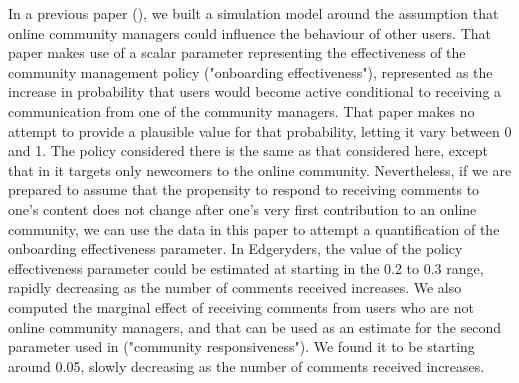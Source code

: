 In a previous paper (\cite{cottica2015online}), we built a simulation model around the assumption that online community managers could influence the behaviour of other users. That paper makes use of a scalar parameter representing the effectiveness of the community management policy ("onboarding effectiveness"), represented as the increase in probability that users would become active conditional to receiving a communication from one of the community managers. That paper makes no attempt to provide a plausible value for that probability, letting it vary between 0 and 1. The policy considered there is the same as that considered here, except that in \cite{cottica2015online} it targets only newcomers to the online community. Nevertheless, if we are prepared to assume that the propensity to respond to receiving comments to one's content does not change after one's very first contribution to an online community, we can use the data in this paper to attempt a quantification of the onboarding effectiveness parameter. In Edgeryders, the value of the policy effectiveness parameter could be estimated at starting in the 0.2 to 0.3 range, rapidly decreasing as the number of comments received increases. We also computed the marginal effect of receiving comments from users who are not online community managers, and that can be used as an estimate for the second parameter used in \cite{cottica2015online} ("community responsiveness"). We found it to be starting around 0.05, slowly decreasing as the number of comments received increases. 